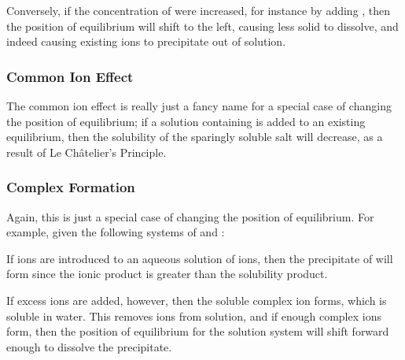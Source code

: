 			Conversely, if the concentration of  were increased, for instance by adding , then the position of equilibrium
			will shift to the left, causing less solid to dissolve, and indeed causing existing ions to precipitate out of solution.

			\subsubsection{Common Ion Effect}

				The common ion effect is really just a fancy name for a special case of changing the position of equilibrium; if a solution
				containing  is added to an existing equilibrium, then the solubility of the sparingly soluble salt will decrease,
				as a result of Le Châtelier's Principle.


			\subsubsection{Complex Formation}

				Again, this is just a special case of changing the position of equilibrium. For example, given the following systems of
				 and \ch{[\Al(OH)4]-}:


				If  ions are introduced to an aqueous solution of  ions, then the precipitate of  will form since
				the ionic product is greater than the solubility product.

				If excess  ions are added, however, then the soluble complex ion \ch{[\Al(OH)4]-} forms, which is soluble in water. This
				removes  ions from solution, and if enough complex ions form, then the position of equilibrium for the solution system
				will shift forward enough to dissolve the precipitate.





















